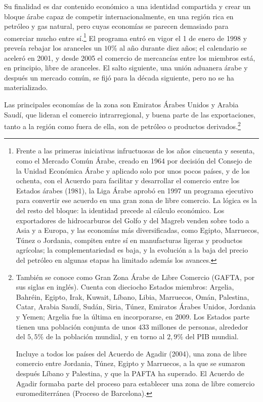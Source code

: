 \documentclass[10pt,a4paper]{article}
\begin{document}
Su finalidad es dar contenido económico a una identidad compartida y crear un bloque árabe capaz de competir internacionalmente, en una región rica en petróleo y gas natural, pero cuyas economías se parecen demasiado para comerciar mucho entre sí.\footnote{%
    Frente a las primeras iniciativas infructuosas de los años cincuenta y sesenta, como el Mercado Común Árabe, creado en 1964 por decisión del Consejo de la Unidad Económica Árabe y aplicado solo por unos pocos países, y de los ochenta, con el Acuerdo para facilitar y desarrollar el comercio entre los Estados árabes (1981), la Liga Árabe aprobó en 1997 un programa ejecutivo para convertir ese acuerdo en una gran zona de libre comercio. La lógica es la del resto del bloque: la identidad precede al cálculo económico. Los exportadores de hidrocarburos del Golfo y del Magreb venden sobre todo a Asia y a Europa, y las economías más diversificadas, como Egipto, Marruecos, Túnez o Jordania, compiten entre sí en manufacturas ligeras y productos agrícolas; la complementariedad es baja, y la evolución a la baja del precio del petróleo en algunas etapas ha limitado además los avances.
}  El programa entró en vigor el 1 de enero de 1998 y preveía rebajar los aranceles un $10\%$ al año durante diez años; el calendario se aceleró en 2001, y desde 2005 el comercio de mercancías entre los miembros está, en principio, libre de aranceles. El salto siguiente, una unión aduanera árabe y después un mercado común, se fijó para la década siguiente, pero no se ha materializado.

Las principales economías de la zona son Emiratos Árabes Unidos y Arabia Saudí, que lideran el comercio intrarregional, y buena parte de las exportaciones, tanto a la región como fuera de ella, son de petróleo o productos derivados.\footnote{%
    También se conoce como Gran Zona Árabe de Libre Comercio (GAFTA, por sus siglas en inglés). Cuenta con dieciocho Estados miembros: Argelia, Bahréin, Egipto, Irak, Kuwait, Líbano, Libia, Marruecos, Omán, Palestina, Catar, Arabia Saudí, Sudán, Siria, Túnez, Emiratos Árabes Unidos, Jordania y Yemen; Argelia fue la última en incorporarse, en 2009. Los Estados parte tienen una población conjunta de unos $433$ millones de personas, alrededor del $5,5\%$ de la población mundial, y en torno al $2,9\%$ del PIB mundial.

    Incluye a todos los países del Acuerdo de Agadir (2004), una zona de libre comercio entre Jordania, Túnez, Egipto y Marruecos, a la que se sumaron después Líbano y Palestina, y que la PAFTA ha superado. El Acuerdo de Agadir formaba parte del proceso para establecer una zona de libre comercio euromediterránea (Proceso de Barcelona).
}
\end{document}
